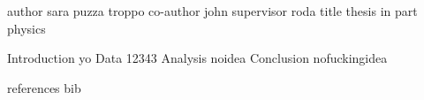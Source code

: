 author  sara puzza troppo	
co-author john
supervisor roda
title  thesis in part physics

Introduction  yo
Data  12343
Analysis  noidea
Conclusion nofuckingidea

references  bib 
